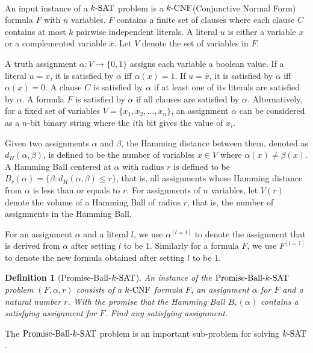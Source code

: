 \documentclass[a4paper,12pts]{article}
\newcommand{\SAT}{\textnormal{$k$-SAT}}
\newcommand{\CNF}{\textnormal{$k$-CNF}}
\newcommand{\dist}[2]{d_H(#1,#2)}
\newcommand{\ball}[2]{B_{#1}(#2)}
\newcommand{\PBS}{\textnormal{Promise-Ball-$\SAT$}}
\newtheorem{definition}{Definition}
\begin{document}
\paragraph{} An input instance of a $\SAT$ problem is a $\CNF$(Conjunctive Normal Form) formula $F$ with $n$ variables. $F$ contains a finite set of clauses where each clause $C$ contains at most $k$ pairwise independent literals. A literal $u$ is either a variable $x$ or a complemented variable $\bar{x}$. Let $V$ denote the set of variables in $F$. \par 
A truth assignment $\alpha: V\rightarrow \{0,1\}$ assigns each variable a boolean value. If a literal $u = x$, it is satisfied by $\alpha$ iff $\alpha(x) = 1$. If $u = \bar{x}$, it is satisfied by $\alpha$ iff $\alpha(x) = 0$. A clause $C$ is satisfied by $\alpha$ if at least one of its literals are satisfied by $\alpha$. A formula $F$ is satisfied by $\alpha$ if all clauses are satisfied by $\alpha$. Alternatively, for a fixed set of variables $V=\{x_1,x_2,...,x_n\}$, an assignment $\alpha$ can be considered as a $n$-bit binary string where the $i$th bit gives the value of $x_i$.\par 
Given two assignments $\alpha$ and $\beta$, the Hamming distance between them, denoted as $\dist{\alpha}{\beta}$, is defined to be the number of variables $x \in V$ where $\alpha(x) \neq \beta(x)$. A Hamming Ball centered at $\alpha$ with radius $r$ is defined to be $\ball{r}{\alpha} = \{\beta: \dist{\alpha}{\beta} \leq r\}$, that is, all assignments whose Hamming distance from $\alpha$ is less than or equals to $r$. For assignments of $n$ variables, let $V(r)$ denote the volume of a Hamming Ball of radius $r$, that is, the number of assignments in the Hamming Ball.\par 
For an assignment $\alpha$ and a literal $l$, we use $\alpha^{[l = 1]}$ to denote the assignment that is derived from $\alpha$ after setting $l$ to be $1$. Similarly for a formula $F$, we use $F^{[l = 1]}$ to denote the new formula obtained after setting $l$ to be $1$. \par 
\begin{definition}[\PBS\cite{Moser11}]
	An instance of the $\PBS$ problem $(F,\alpha,r)$ consists of a $\CNF$ formula $F$, an assignment $\alpha$ for $F$ and a natural number $r$. With the promise that the Hamming Ball $\ball{r}{\alpha}$ contains a satisfying assignment for $F$. Find any satisfying assignment.
\end{definition}
The $\PBS$ problem is an important sub-problem for solving $\SAT$. 
\end{document}
